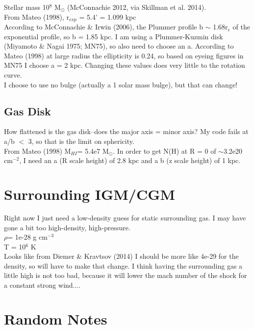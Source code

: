 \documentclass[12pt,preprint]{aastex}
\begin{document}
Stellar mass 10$^8$ M$_{\odot}$ (McConnachie 2012, via Skillman et al. 2014).  \\
From Mateo (1998), r$_{exp}$ = 5.4' = 1.099 kpc\\
According to McConnachie \& Irwin (2006), the Plummer profile b $\sim$ 1.68r$_e$ of the exponential profile, so b = 1.85 kpc.  I am using a Plummer-Kuzmin disk (Miyamoto \& Nagai 1975; MN75), so also need to choose an a. According to Mateo (1998) at large radius the ellipticity is 0.24, so based on eyeing figures in MN75 I choose a = 2 kpc.  Changing these values does very little to the rotation curve.\\

I choose to use no bulge (actually a 1 solar mass bulge), but that can change!\\

 
\subsection{Gas Disk}

How flattened is the gas disk--does the major axis = minor axis?  My code fails at a/b $<$ 3, so that is the limit on sphericity.\\

From Mateo (1998) M$_{HI}$= 5.4e7 M$_{\odot}$.  In order to get N(H) at R = 0 of $\sim$3.2e20 cm$^{-2}$, I need an a (R scale height) of 2.8 kpc and a b (z scale height) of 1 kpc.   

\section{Surrounding IGM/CGM}

Right now I just need a low-density guess for static surrounding gas.  I may have gone a bit too high-density, high-pressure.  \\
\indent $\rho$= 1e-28 g cm$^{-3}$\\
\indent T = 10$^6$ K\\

Looks like from Diemer \& Kravtsov (2014) I should be more like 4e-29 for the density, so will have to make that change.  I think having the surrounding gas a little high is not too bad, because it will lower the mach number of the shock for a constant strong wind....

\section{Random Notes}
\end{document}
